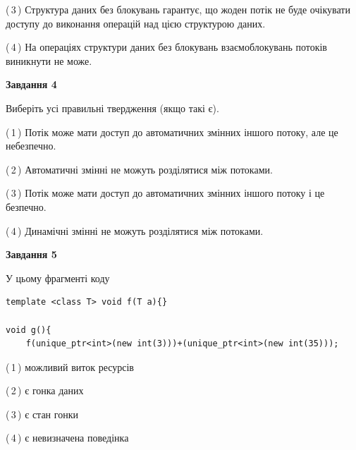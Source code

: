\documentclass[12pt, ukrainian]{article}
\begin{document}
\begin {large}
{(\,3\,) Структура даних без блокувань гарантує, що жоден потік не буде очікувати доступу до виконання операцій над цією структурою даних.%

(\,4\,) На операціях структури даних без блокувань взаємоблокувань потоків виникнути не може.%



\begin{center}
\textbf{Завдання 4}
\end{center}
Виберіть усі правильні твердження (якщо такі є).\par
\vspace{2mm}

(\,1\,) Потік може мати доступ до автоматичних змінних іншого потоку, але це небезпечно.%

(\,2\,) Автоматичні змінні не можуть розділятися між потоками.%

(\,3\,) Потік може мати доступ до автоматичних змінних іншого потоку і це безпечно.%

(\,4\,) Динамічні змінні не можуть розділятися між потоками.%



\begin{center}
\textbf{Завдання 5}
\end{center}
У цьому фрагменті коду
\begin{verbatim}
template <class T> void f(T a){}

void g(){
    f(unique_ptr<int>(new int(3)))+(unique_ptr<int>(new int(35)));
\end{verbatim}

(\,1\,) можливий виток ресурсів%

(\,2\,) є гонка даних%

(\,3\,) є стан гонки%

(\,4\,) є невизначена поведінка%


}
\end {large}
\end{document}

